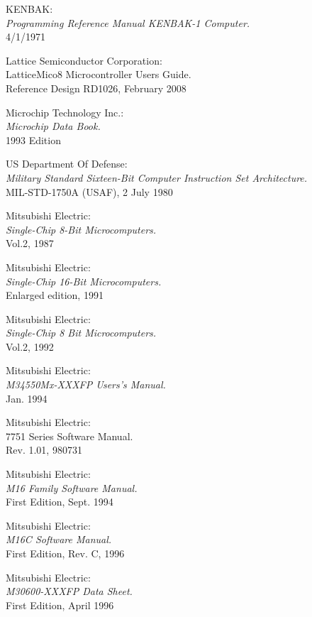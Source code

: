  KENBAK: \\
		{\em Programming Reference Manual KENBAK-1 Computer.} \\
		4/1/1971

 Lattice Semiconductor Corporation: \\
		{LatticeMico8 Microcontroller Users Guide.\/} \\
		Reference Design RD1026, February 2008

 Microchip Technology Inc.: \\
		{\em Microchip Data Book.\/} \\
		1993 Edition

 US Department Of Defense: \\
		{\em Military Standard Sixteen-Bit Computer
		Instruction Set Architecture.\/} \\
		MIL-STD-1750A (USAF), 2 July 1980

 Mitsubishi Electric: \\
		{\em Single-Chip 8-Bit Microcomputers.\/} \\
		Vol.2, 1987

 Mitsubishi Electric: \\
		{\em Single-Chip 16-Bit Microcomputers.\/} \\
		Enlarged edition, 1991

 Mitsubishi Electric: \\
		{\em Single-Chip 8 Bit Microcomputers.\/} \\
		Vol.2, 1992

 Mitsubishi Electric: \\
		{\em M34550Mx-XXXFP Users's Manual.\/} \\
		Jan. 1994

 Mitsubishi Electric: \\
		{ 7751 Series Software Manual.\/} \\
		Rev. 1.01, 980731

 Mitsubishi Electric: \\
		{\em M16 Family Software Manual.\/} \\
		First Edition, Sept. 1994

 Mitsubishi Electric: \\
		{\em M16C Software Manual.\/} \\
		First Edition, Rev. C, 1996

 Mitsubishi Electric: \\
		{\em M30600-XXXFP Data Sheet.\/} \\
		First Edition, April 1996

